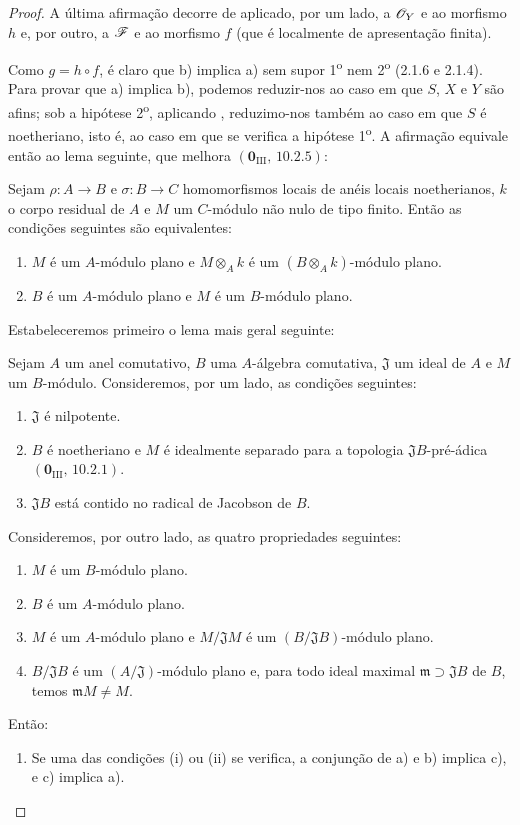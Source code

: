 \begin{proof}
A última afirmação decorre de
 aplicado, por um lado,
a $\mathscr{O}_Y$ e ao morfismo $h$ e,
por outro, a $\mathscr{F}$ e ao morfismo $f$
(que é localmente de apresentação finita).

Como $g=h\circ f$, é claro que b) implica
a) sem supor 1\textsuperscript{o} nem
2\textsuperscript{o} (2.1.6 e 2.1.4).
Para provar que a) implica b), podemos
reduzir-nos ao caso em que $S$, $X$ e $Y$
são afins; sob a hipótese
2\textsuperscript{o}, aplicando
, reduzimo-nos também
ao caso em que $S$ é noetheriano,
isto é, ao caso em que se verifica a
hipótese 1\textsuperscript{o}. A afirmação
equivale então ao lema seguinte, que melhora
$(\mathbf 0_{\mathrm{III}},\,10.2.5)$:

\begin{lemma}[11.3.10.1]
\label{IV.11.3.10.1}
Sejam $\rho:A\to B$ e $\sigma:B\to C$
homomorfismos locais de anéis locais
noetherianos, $k$ o corpo residual de $A$
e $M$ um $C$-módulo não nulo de tipo
finito. Então as condições seguintes
são equivalentes:
\begin{enumerate}[label=\emph{\alph*)}]
\item $M$ é um $A$-módulo plano e
$M\otimes_Ak$ é um
$(B\otimes_Ak)$-módulo plano.
\item $B$ é um $A$-módulo plano e
$M$ é um $B$-módulo plano.
\end{enumerate}
\end{lemma}

Estabeleceremos primeiro o lema mais geral
seguinte:

\begin{lemma}[11.3.10.2]
\label{IV.11.3.10.2}
Sejam $A$ um anel comutativo, $B$ uma
$A$-álgebra comutativa, $\mathfrak J$
um ideal de $A$ e $M$ um $B$-módulo.
Consideremos, por um lado, as condições
seguintes:
\begin{enumerate}[label=\emph{(\roman*)}]
\item $\mathfrak J$ é nilpotente.
\item $B$ é noetheriano e $M$ é
idealmente separado para a topologia
$\mathfrak JB$-pré-ádica
$(\mathbf 0_{\mathrm{III}},\,10.2.1)$.
\item $\mathfrak JB$ está contido no
radical de Jacobson de $B$.
\end{enumerate}
Consideremos, por outro lado, as quatro
propriedades seguintes:
\begin{enumerate}[label=\emph{\alph*)}]
\item $M$ é um $B$-módulo plano.
\item $B$ é um $A$-módulo plano.
\item $M$ é um $A$-módulo plano e
$M/\mathfrak JM$ é um
$(B/\mathfrak JB)$-módulo plano.
\item $B/\mathfrak JB$ é um
$(A/\mathfrak J)$-módulo plano e,
para todo ideal maximal
$\mathfrak m\supset\mathfrak JB$ de $B$,
temos $\mathfrak mM\neq M$.
\end{enumerate}
Então:
\begin{enumerate}[label=\arabic{enumi}\textsuperscript{o}]
\item Se uma das condições (i) ou (ii)
se verifica, a conjunção de a) e b)
implica c), e c) implica a).


\end{enumerate}
\end{lemma}
\end{proof}
